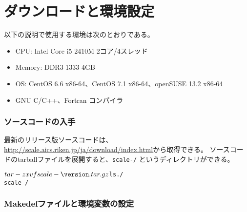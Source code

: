 
\section{ダウンロードと環境設定} \label{sec:download}

以下の説明で使用する環境は次のとおりである。
\begin{itemize}
\item CPU: Intel Core i5 2410M 2コア/4スレッド
\item Memory: DDR3-1333 4GB
\item OS: CentOS 6.6 x86-64、CentOS 7.1 x86-64、openSUSE 13.2 x86-64
\item GNU C/C++、Fortran コンパイラ
\end{itemize}

\subsubsection{ソースコードの入手} \label{subsec:get_source_code}
最新のリリース版ソースコードは、\url{http://scale.aics.riken.jp/ja/download/index.html}から取得できる。
ソースコードのtarballファイルを展開すると、\texttt{scale-{\version}/} というディレクトリができる。
\begin{alltt}
 $ tar -zxvf scale-{\version}.tar.gz
 $ ls ./
    scale-{\version}/
\end{alltt}

\subsubsection{Makedefファイルと環境変数の設定} \label{subsec:environment}

